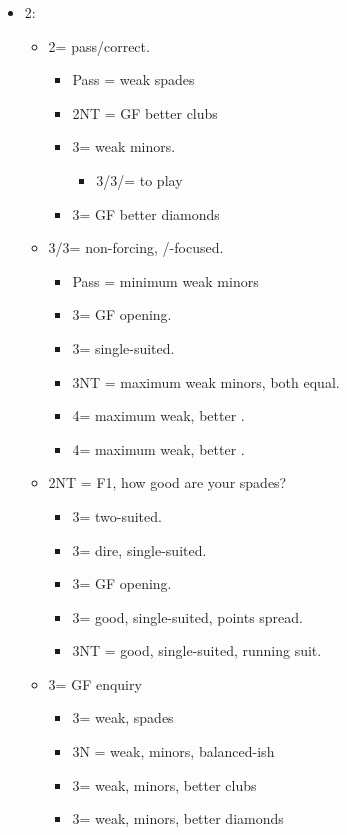 \documentclass[a4paper,14pt]{extarticle}
\begin{document}
\begin{itemize}
\newpage

\item 2\hearts:
	\begin{itemize}
   \item 2\spades = pass/correct.
		\begin{itemize}
	   \item Pass = weak spades
      \item 2NT = GF better clubs
      \item 3\clubs = weak minors.
			\begin{itemize}
			\item 3\diamonds/3\hearts/\spades = to play
			\end{itemize}
      \item 3\diamonds = GF better diamonds
		\end{itemize}
   \item 3\clubs/3\diamonds = non-forcing, \clubs/\diamonds-focused.
		\begin{itemize}
		\item Pass = minimum weak minors
      \item 3\hearts = GF opening.
      \item 3\spades = single-suited.
      \item 3NT = maximum weak minors, both equal.
      \item 4\clubs = maximum weak, better \clubs.
      \item 4\diamonds = maximum weak, better \diamonds.
		\end{itemize}
   \item 2NT = F1, how good are your spades?
		\begin{itemize}
      \item 3\clubs = two-suited.
      \item 3\diamonds = dire, single-suited.
      \item 3\hearts = GF opening.
      \item 3\spades = good, single-suited, points spread.
      \item 3NT = good, single-suited, running suit.
		\end{itemize}
	\item 3\hearts = GF enquiry
		\begin{itemize}
		\item 3\spades = weak, spades
		\item 3N = weak, minors, balanced-ish
		\item 3\clubs = weak, minors, better clubs
		\item 3\diamonds = weak, minors, better diamonds
		\end{itemize}
	\end{itemize}


\end{itemize}
\end{document}
